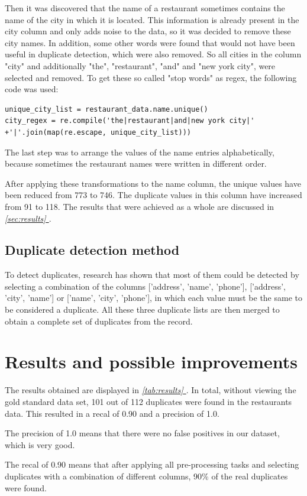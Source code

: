 \documentclass[conference]{IEEEtran}
\newcommand*{\fullref}[1]{\textit{\hyperref[{#1}]{\autoref*{#1} \nameref*{#1}}}}
\begin{document}
Then it was discovered that the name of a restaurant sometimes contains the name of the city in which it is located. This information is already present in the city column and only adds noise to the data, so it was decided to remove these city names. In addition, some other words were found that would not have been useful in duplicate detection, which were also removed. So all cities in the column "city" and additionally "the", "restaurant", "and" and "new york city", were selected and removed. To get these so called "stop words" as regex, the following code was used: 
\begin{lstlisting}
unique_city_list = restaurant_data.name.unique()
city_regex = re.compile('the|restaurant|and|new york city|' +'|'.join(map(re.escape, unique_city_list)))
\end{lstlisting}
The last step was to arrange the values of the name entries alphabetically, because sometimes the restaurant names were written in different order. 

After applying these transformations to the name column, the unique values have been reduced from 773 to 746. The duplicate values in this column have increased from 91 to 118. The results that were achieved as a whole are discussed in \fullref{sec:results}.
\subsection{Duplicate detection method} \label{sec:dup_detection_method}
To detect duplicates, research has shown that most of them could be detected by selecting a combination of the columns ['address', 'name', 'phone'], ['address', 'city', 'name'] or ['name', 'city', 'phone'], in which each value must be the same to be considered a duplicate. All these three duplicate lists are then merged to obtain a complete set of duplicates from the record.
\section{Results and possible improvements}\label{sec:results}
The results obtained are displayed in \fullref{tab:results}. In total, without viewing the gold standard data set, 101 out of 112 duplicates were found in the restaurants data. This resulted in a recal of 0.90 and a precision of 1.0. 

The precision of 1.0 means that there were no false positives in our dataset, which is very good. 

The recal of 0.90 means that after applying all pre-processing tasks and selecting duplicates with a combination of different columns, 90\% of the real duplicates were found.
\end{document}
